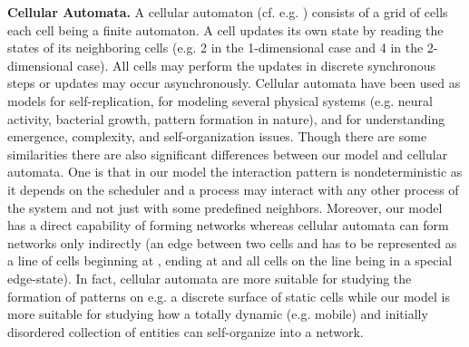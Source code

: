 \documentclass[oribibl, 11pt]{llncs}
\begin{document}
\noindent\textbf{Cellular Automata.} A cellular automaton (cf. e.g. \cite{Sc11}) consists of a grid of cells each cell being a finite automaton. A cell updates its own state by reading the states of its neighboring cells (e.g. 2 in the 1-dimensional case and 4 in the 2-dimensional case). All cells may perform the updates in discrete synchronous steps or updates may occur asynchronously. Cellular automata have been used as models for self-replication, for modeling several physical systems (e.g. neural activity, bacterial growth, pattern formation in nature), and for understanding emergence, complexity, and self-organization issues. Though there are some similarities there are also significant differences between our model and cellular automata. One is that in our model the interaction pattern is nondeterministic as it depends on the scheduler and a process may interact with any other process of the system and not just with some predefined neighbors. Moreover, our model has a direct capability of forming networks whereas cellular automata can form networks only indirectly (an edge between two cells  and  has to be represented as a line of cells beginning at , ending at  and all cells on the line being in a special edge-state). In fact, cellular automata are more suitable for studying the formation of patterns on e.g. a discrete surface of static cells while our model is more suitable for studying how a totally dynamic (e.g. mobile) and initially disordered collection of entities can self-organize into a network.\\
\end{document}

